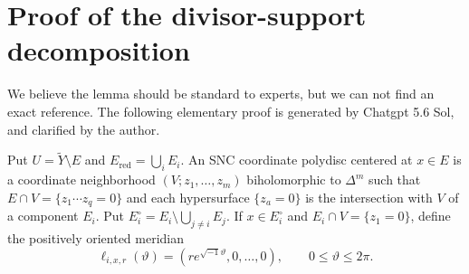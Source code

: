 \documentclass[reqno]{amsart}
\theoremstyle{plain}
\theoremstyle{remark}
\begin{document}
\appendix
\section{Proof of the divisor-support decomposition}
\label{sec:support-decomposition}

We believe the lemma should be standard to experts, but we can not find an exact reference. The following elementary proof is generated by Chatgpt 5.6 Sol, and clarified by the author. 

Put $U=\widetilde Y\setminus E$ and
$E_{\mathrm{red}}=\bigcup_i E_i$. An SNC coordinate polydisc centered
at $x\in E$ is a coordinate neighborhood $(V;z_1,\ldots,z_m)$
biholomorphic to $\Delta^m$ such that
$E\cap V=\{z_1\cdots z_q=0\}$ and each hypersurface $\{z_a=0\}$ is
the intersection with $V$ of a component $E_i$. Put
$E_i^\circ=E_i\setminus\bigcup_{j\ne i}E_j$. If $x\in E_i^\circ$
and $E_i\cap V=\{z_1=0\}$, define the positively oriented meridian
\[
 \ell_{i,x,r}(\vartheta)
 =(re^{\sqrt{-1}\vartheta},0,\ldots,0),
 \qquad0\leq\vartheta\leq2\pi.
\]
\end{document}
